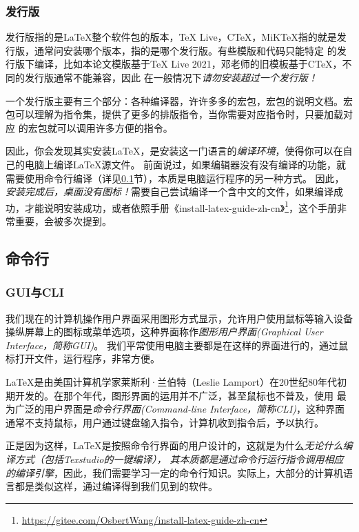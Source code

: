 \subsubsection{发行版}\label{subsub:fxb}


发行版指的是\LaTeX{}整个软件包的版本，\TeX{} Live，C\TeX{}，MiK\TeX{}指的就是发行版，通常问安装哪个版本，指的是哪个发行版。有些模版和代码只能特定
的发行版下编译，比如本论文模版基于\TeX{} Live 2021，邓老师的旧模板基于C\TeX{}，不同的发行版通常不能兼容，因此
在一般情况下\emph{请勿安装超过一个发行版！}

一个发行版主要有三个部分：各种编译器，许许多多的宏包，宏包的说明文档。宏包可以理解为指令集，提供了更多的排版指令，当你需要对应指令时，只要加载对应
的宏包就可以调用许多方便的指令。

因此，你会发现其实安装\LaTeX{}，是安装这一门语言的\emph{编译环境}，使得你可以在自己的电脑上编译\LaTeX{}源文件。
前面说过，如果编辑器没有没有编译的功能，就需要使用命令行编译（详见\ref{subsec:mlh}节），本质是电脑运行程序的另一种方式。
因此，\emph{安装完成后，桌面没有图标！}需要自己尝试编译一个含中文的文件，如果编译成功，才能说明安装成功，或者依照手册《install-latex-guide-zh-cn》\footnote{\url{https://gitee.com/OsbertWang/install-latex-guide-zh-cn}}，这个手册非常重要，会被多次提到。




\subsection{命令行}\label{subsec:mlh}


\subsubsection{GUI与CLI}


我们现在的计算机操作用户界面采用图形方式显示，允许用户使用鼠标等输入设备操纵屏幕上的图标或菜单选项，这种界面称作\emph{图形用户界面(Graphical User Interface，简称GUI)}。
我们平常使用电脑主要都是在这样的界面进行的，通过鼠标打开文件，运行程序，非常方便。

\LaTeX{}是由美国计算机学家莱斯利·兰伯特（Leslie Lamport）在20世纪80年代初期开发的。在那个年代，图形界面的运用并不广泛，甚至鼠标也不普及，使用
最为广泛的用户界面是\emph{命令行界面(Command-line Interface，简称CLI)}，这种界面通常不支持鼠标，用户通过键盘输入指令，计算机收到指令后，予以执行。

正是因为这样，\LaTeX{}是按照命令行界面的用户设计的，这就是为什么\emph{无论什么编译方式（包括Texstudio的一键编译），
其本质都是通过命令行运行指令调用相应的编译引擎}，因此，我们需要学习一定的命令行知识。实际上，大部分的计算机语言都是类似这样，通过编译得到我们见到的软件。




